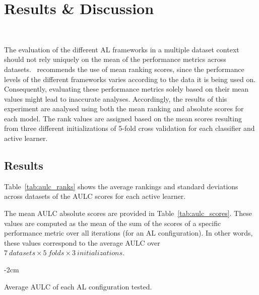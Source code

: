\documentclass[preprint,12pt]{elsarticle}
\begin{document}
\section{Results \& Discussion}~\label{sec:results}

The evaluation of the different AL frameworks in a multiple dataset context
should not rely uniquely on the mean of the performance metrics across
datasets.~\cite{demvsar2006} recommends the use of mean ranking scores, since
the performance levels of the different frameworks varies according to the
data it is being used on. Consequently, evaluating these performance metrics
solely based on their mean values might lead to inaccurate analyses.
Accordingly, the results of this experiment are analysed using both the mean
ranking and absolute scores for each model. The rank values are assigned
based on the mean scores resulting from three different initializations of
5-fold cross validation for each classifier and active learner.

\subsection{Results}

Table~\ref{tab:aulc_ranks} shows the average rankings and standard deviations
across datasets of the AULC scores for each active learner.


The mean AULC absolute scores are provided in Table~\ref{tab:aulc_scores}.
These values are computed as the mean of the sum of the scores of a specific
performance metric over all iterations (for an AL configuration). In other
words, these values correspond to the average AULC over $7\ datasets \times 5\
folds \times 3\ initializations$.

\begin{table}[H]
    \centering
    \addtolength{\leftskip} {-2cm}
    \addtolength{\rightskip}{-2cm}
    \caption{\label{tab:aulc_scores}
        Average AULC of each AL configuration tested.
    }
\end{table}
\end{document}
